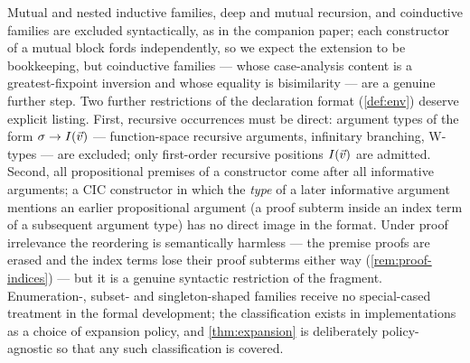 Mutual and nested inductive families, deep and mutual recursion, and
coinductive families are excluded syntactically, as in the companion
paper; each constructor of a mutual block fords independently, so we
expect the extension to be bookkeeping, but coinductive families ---
whose case-analysis content is a greatest-fixpoint inversion and whose
equality is bisimilarity --- are a genuine further step.  Two further
restrictions of the declaration format (\cref{def:env}) deserve
explicit listing.  First, recursive occurrences must be direct:
argument types of the form $\sigma \to I(\vec{v})$ --- function-space
recursive arguments, infinitary branching, W-types --- are excluded;
only first-order recursive positions $I(\vec{v})$ are admitted.
Second, all propositional premises of a constructor come after all
informative arguments; a CIC constructor in which the \emph{type} of a
later informative argument mentions an earlier propositional argument
(a proof subterm inside an index term of a subsequent argument type)
has no direct image in the format.  Under proof irrelevance the
reordering is semantically harmless --- the premise proofs are erased
and the index terms lose their proof subterms either way
(\cref{rem:proof-indices}) --- but it is a genuine syntactic
restriction of the fragment.  Enumeration-,
subset- and singleton-shaped families receive no special-cased
treatment in the formal development; the classification exists in
implementations as a choice of expansion policy, and
\cref{thm:expansion} is deliberately policy-agnostic so that any such
classification is covered.
